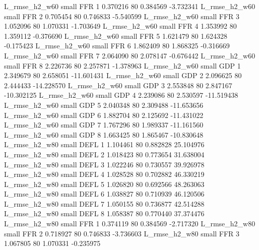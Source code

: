  L_rmse_h2_w60      small      FFR                 1 0.370216 80       0.384569          -3.732341
 L_rmse_h2_w60      small      FFR                 2 0.705454 80       0.746833          -5.540599
 L_rmse_h2_w60      small      FFR                 3 1.052096 80       1.070331          -1.703649
 L_rmse_h2_w60      small      FFR                 4 1.353992 80       1.359112          -0.376690
 L_rmse_h2_w60      small      FFR                 5 1.621479 80       1.624328          -0.175423
 L_rmse_h2_w60      small      FFR                 6 1.862409 80       1.868325          -0.316669
 L_rmse_h2_w60      small      FFR                 7 2.064090 80       2.078147          -0.676442
 L_rmse_h2_w60      small      FFR                 8 2.226736 80       2.257871          -1.378963
 L_rmse_h2_w60      small      GDP                 1 2.349679 80       2.658051         -11.601431
 L_rmse_h2_w60      small      GDP                 2 2.096625 80       2.444433         -14.228570
 L_rmse_h2_w60      small      GDP                 3 2.553848 80       2.847167         -10.302125
 L_rmse_h2_w60      small      GDP                 4 2.239086 80       2.530597         -11.519438
 L_rmse_h2_w60      small      GDP                 5 2.040348 80       2.309488         -11.653656
 L_rmse_h2_w60      small      GDP                 6 1.882704 80       2.125692         -11.431022
 L_rmse_h2_w60      small      GDP                 7 1.767296 80       1.989337         -11.161560
 L_rmse_h2_w60      small      GDP                 8 1.663425 80       1.865467         -10.830648
 L_rmse_h2_w80      small     DEFL                 1 1.104461 80       0.882828          25.104976
 L_rmse_h2_w80      small     DEFL                 2 1.018423 80       0.773654          31.638004
 L_rmse_h2_w80      small     DEFL                 3 1.022246 80       0.730557          39.926978
 L_rmse_h2_w80      small     DEFL                 4 1.028528 80       0.702882          46.330219
 L_rmse_h2_w80      small     DEFL                 5 1.026820 80       0.692566          48.263063
 L_rmse_h2_w80      small     DEFL                 6 1.038827 80       0.710939          46.120506
 L_rmse_h2_w80      small     DEFL                 7 1.050155 80       0.736877          42.514288
 L_rmse_h2_w80      small     DEFL                 8 1.058387 80       0.770440          37.374476
 L_rmse_h2_w80      small      FFR                 1 0.374119 80       0.384569          -2.717320
 L_rmse_h2_w80      small      FFR                 2 0.718927 80       0.746833          -3.736603
 L_rmse_h2_w80      small      FFR                 3 1.067805 80       1.070331          -0.235975
